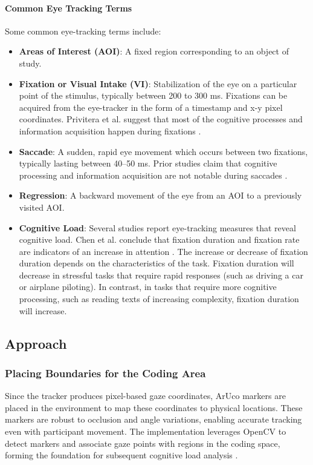 \paragraph{Common Eye Tracking Terms} Some common eye-tracking terms include:
\begin{itemize}
    \item \textbf{Areas of Interest (AOI)}: A fixed region corresponding to an object of study.
    \item \textbf{Fixation or Visual Intake (VI)}: Stabilization of the eye on a particular point of the stimulus, typically between 200 to 300 ms. Fixations can be acquired from the eye-tracker in the form of a timestamp and x-y pixel coordinates. Privitera et al. suggest that most of the cognitive processes and information acquisition happen during fixations \cite{16_Privitera2000}.
    \item \textbf{Saccade}: A sudden, rapid eye movement which occurs between two fixations, typically lasting between 40–50 ms. Prior studies claim that cognitive processing and information acquisition are not notable during saccades \cite{6_Duchowski2003,16_Privitera2000}.
    \item \textbf{Regression}: A backward movement of the eye from an AOI to a previously visited AOI.
    \item \textbf{Cognitive Load}: Several studies report eye-tracking measures that reveal cognitive load. Chen et al. conclude that fixation duration and fixation rate are indicators of an increase in attention \cite{4_Chen2011}. The increase or decrease of fixation duration depends on the characteristics of the task. Fixation duration will decrease in stressful tasks that require rapid responses (such as driving a car \cite{23_Falkmer2005} or airplane piloting). In contrast, in tasks that require more cognitive processing, such as reading texts of increasing complexity, fixation duration will increase.
\end{itemize}

\subsection{Approach}
\subsubsection{Placing Boundaries for the Coding Area}
Since the tracker produces pixel-based gaze coordinates, ArUco markers are placed in the environment to map these coordinates to physical locations. These markers are robust to occlusion and angle variations, enabling accurate tracking even with participant movement. The implementation leverages OpenCV to detect markers and associate gaze points with regions in the coding space, forming the foundation for subsequent cognitive load analysis \cite{9_Garrido-Jurado2014}.


